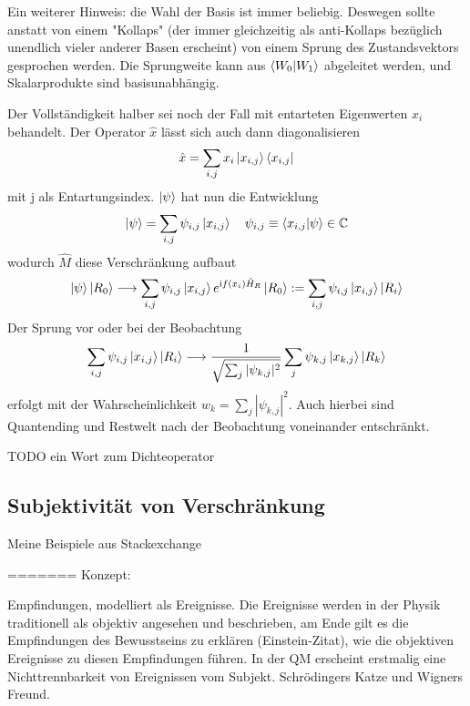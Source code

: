 \documentclass[12pt]{book}
\begin{document}
Ein weiterer Hinweis: die Wahl der Basis ist immer beliebig. Deswegen sollte anstatt von einem "Kollaps" (der immer gleichzeitig als anti-Kollaps bezüglich unendlich vieler anderer Basen erscheint) von einem Sprung des Zustandsvektors gesprochen werden. Die Sprungweite kann aus $\bra{W_0}\ket{W_1}$ abgeleitet werden, und Skalarprodukte sind basisunabhängig.

Der Vollständigkeit halber sei noch der Fall mit entarteten Eigenwerten ${x_i}$ behandelt. Der Operator $\hat{x}$ lässt sich auch dann diagonalisieren
\begin{equation}
\hat{x} = \sum_{i,j} x_i \ket{x_{i,j}}\bra{x_{i,j}}
\end{equation} 
mit j als Entartungsindex. $\ket{\psi}$ hat nun die Entwicklung
\begin{equation} 
\ket{\psi} = \sum_{i,j} \psi_{i,j} \ket{x_{i,j}} \quad \psi_{i,j} \equiv \bra{x_{i,j}}\ket{\psi} \in \mathbb{C}
\end{equation}
wodurch $\hat{M}$ diese Verschränkung aufbaut
\begin{equation} \label{eq:measurement_degeneracy}
\ket{\psi} \ket{R_0} \longrightarrow \sum_{i,j} \psi_{i,j} \ket{x_{i,j}} e^{ \mathrm{i} f(x_i) \hat{H}_R } \ket{R_0} := \sum_{i,j} \psi_{i,j} \ket{x_{i,j}} \ket{R_i}
\end{equation} 
Der Sprung vor oder bei der Beobachtung 
\begin{equation} \label{eq:collapse_degeneracy}
\sum_{i,j} \psi_{i,j} \ket{x_{i,j}} \ket{R_i} \longrightarrow \frac{1}{\sqrt{\sum_j |\psi_{k,j}|^2}} \sum_{j} \psi_{k,j} \ket{x_{k,j}} \ket{R_k} 
\end{equation} 
erfolgt mit der Wahrscheinlichkeit $w_k = \sum_j |\psi_{k,j}|^2$. Auch hierbei sind Quantending und Restwelt nach der Beobachtung voneinander entschränkt.

TODO ein Wort zum Dichteoperator

\subsection{Subjektivität von Verschränkung}

Meine Beispiele aus Stackexchange


=======
Konzept:

Empfindungen, modelliert als Ereignisse. Die Ereignisse werden in der Physik traditionell als objektiv angesehen und beschrieben, am Ende gilt es die Empfindungen des Bewusstseins zu erklären (Einstein-Zitat), wie die objektiven Ereignisse zu diesen Empfindungen führen. In der QM erscheint erstmalig eine Nichttrennbarkeit von Ereignissen vom Subjekt. Schrödingers Katze und Wigners Freund.
\end{document}
